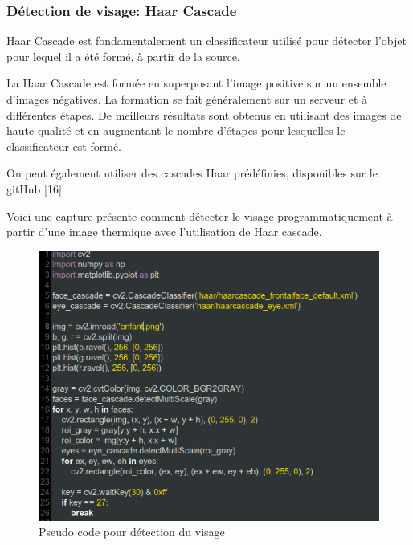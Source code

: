 \documentclass[12pt]{article}
\begin{document}
\subsubsection*{Détection de visage: Haar Cascade}
Haar Cascade est fondamentalement un classificateur utilisé pour détecter l'objet pour lequel il a été formé, à partir de la source.

La Haar Cascade est formée en superposant l'image positive sur un ensemble d'images négatives. La formation se fait généralement sur un serveur et à différentes étapes. De meilleurs résultats sont obtenus en utilisant des images de haute qualité et en augmentant le nombre d'étapes pour lesquelles le classificateur est formé.

On peut également utiliser des cascades Haar prédéfinies, disponibles sur le gitHub [16]

Voici une capture présente comment détecter le visage programmatiquement à partir d'une image thermique avec l'utilisation de Haar cascade.
\newpage
\begin{figure}[h]
	\centering
	\includegraphics[width=15cm]{img-Chapiter-4/detection.png}
	\caption{Pseudo code pour détection du visage}
\end{figure}
\end{document}
